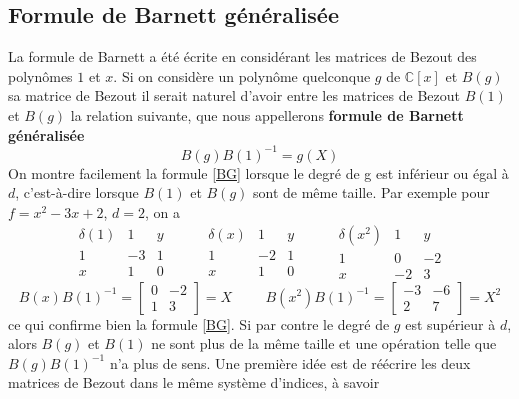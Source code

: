 \documentclass{article}
\theoremstyle{plain}%
\theoremstyle{definition}
\theoremstyle{remark}
\newcommand{\C}{\mathbb{C}}
\begin{document}
\subsection{Formule de Barnett généralisée}
\label{Bar_gen}
La formule de Barnett a été écrite en considérant les matrices de Bezout des polynômes $1$ et $x$.
Si on considère un polynôme quelconque $g$ de $\C[x]$ et $B(g)$ sa matrice de Bezout il serait naturel d'avoir entre les matrices de Bezout $B(1)$ et $B(g)$ la relation suivante, que nous appellerons {\bf formule de Barnett généralisée}
\begin{equation}
	\label{BG}
	B(g)B(1)^{-1} = g(X)
\end{equation}
On montre facilement la formule \ref{BG} lorsque le degré de g est inférieur ou égal à $d$, c'est-à-dire lorsque $B(1)$ et $B(g)$ sont de même taille. Par exemple pour $f = x^2 - 3x + 2$, $d = 2$, on a
$$
\begin{array}{c|cc}
	\delta(1) & 1 & y \\
	\hline
	1 & -3 & 1 \\
	x & 1 & 0
\end{array}
\hspace{1cm}
\begin{array}{c|cc}
	\delta(x) & 1 & y \\
	\hline
	1 & -2 & 1 \\
	x & 1 & 0
\end{array}
\hspace{1cm}
\begin{array}{c|cc}
	\delta(x^2) & 1 & y \\
	\hline
	1 & 0 & -2 \\
	x & -2 & 3
\end{array}
$$
\begin{equation}
	B(x)B(1)^{-1} =
	\begin{bmatrix}
		0 & -2 \\
		1 & 3
	\end{bmatrix}
	= X
	\hspace{1cm}
	B(x^2)B(1)^{-1} =
	\begin{bmatrix}
		-3 & -6 \\
		2 & 7
	\end{bmatrix}
	= X^2
\end{equation}
ce qui confirme bien la formule \ref{BG}.
Si par contre le degré de $g$ est supérieur à $d$, alors $B(g)$ et $B(1)$ ne sont plus de la même taille et une opération telle que $B(g)B(1)^{-1}$ n'a plus de sens. Une première idée est de réécrire les deux matrices de Bezout dans le même système d'indices, à savoir
\end{document}
